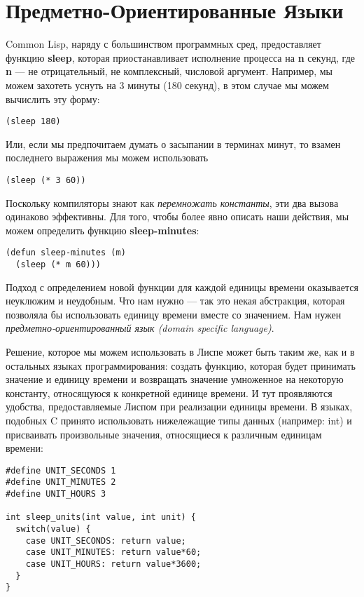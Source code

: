 \section{Предметно-Ориентированные Языки}\label{section_domain_specific_languages}

Common Lisp, наряду с большинством программных сред, предоставляет функцию \textbf{sleep}, которая приостанавливает исполнение процесса на \textbf{n} секунд, где \textbf{n} --- не отрицательный, не комплексный, числовой аргумент. Например, мы можем захотеть уснуть на 3 минуты (180 секунд), в этом случае мы можем вычислить эту форму:

\begin{verbatim}
(sleep 180)
\end{verbatim}

Или, если мы предпочитаем думать о засыпании в терминах минут, то взамен последнего выражения мы можем использовать

\begin{verbatim}
(sleep (* 3 60))
\end{verbatim}

Поскольку компиляторы знают как \emph{перемножать константы}, эти два вызова одинаково эффективны. Для того, чтобы более явно описать наши действия, мы можем определить функцию \textbf{sleep-minutes}:

\begin{verbatim}
(defun sleep-minutes (m)
  (sleep (* m 60)))
\end{verbatim}

Подход с определением новой функции для каждой единицы времени оказывается неуклюжим и неудобным. Что нам нужно --- так это некая абстракция, которая позволяла бы использовать единицу времени вместе со значением. Нам нужен \emph{предметно-ориентированный язык (domain specific language)}.

Решение, которое мы можем использовать в Лиспе может быть таким же, как и в остальных языках программирования: создать функцию, которая будет принимать значение и единицу времени и возвращать значение умноженное на некоторую константу, относящуюся к конкретной единице времени. И тут проявляются удобства, предоставляемые Лиспом при реализации единицы времени. В языках, подобных C принято использовать нижележащие типы данных (например: int) и присваивать произвольные значения, относящиеся к различным единицам времени:

\begin{verbatim}
#define UNIT_SECONDS 1
#define UNIT_MINUTES 2
#define UNIT_HOURS 3

int sleep_units(int value, int unit) {
  switch(value) {
    case UNIT_SECONDS: return value;
    case UNIT_MINUTES: return value*60;
    case UNIT_HOURS: return value*3600;
  }
}
\end{verbatim}

